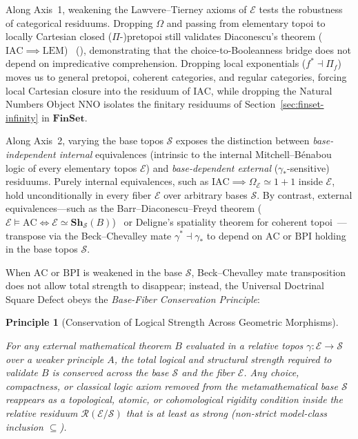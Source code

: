 \documentclass[10pt,twoside,openright]{book}
\theoremstyle{crmplain}
\newtheorem{principle}[theorem]{Principle}
\theoremstyle{crmdef}
\theoremstyle{crmremark}
\begin{document}
Along Axis~1, weakening the Lawvere--Tierney axioms of $\mathcal{E}$ tests the robustness of categorical residuums. Dropping $\Omega$ and passing from elementary topoi to locally Cartesian closed ($\Pi$-)pretopoi still validates Diaconescu's theorem ($\mathrm{IAC} \implies \mathrm{LEM}$)~\cite{Diaconescu75,Maietti05} (\cite[\S D4.5]{Johnstone02}), demonstrating that the choice-to-Booleanness bridge does not depend on impredicative comprehension. Dropping local exponentials ($f^* \dashv \Pi_f$) moves us to general pretopoi, coherent categories, and regular categories, forcing local Cartesian closure into the residuum of $\mathrm{IAC}$, while dropping the Natural Numbers Object $\mathrm{NNO}$ isolates the finitary residuums of Section~\ref{sec:finset-infinity} in $\mathbf{FinSet}$.

Along Axis~2, varying the base topos $\mathcal{S}$ exposes the distinction between \emph{base-independent internal} equivalences (intrinsic to the internal Mitchell--B\'enabou logic of every elementary topos $\mathcal{E}$) and \emph{base-dependent external} ($\gamma_*$-sensitive) residuums. Purely internal equivalences, such as $\mathrm{IAC} \implies \Omega_{\mathcal{E}} \simeq 1+1$ inside $\mathcal{E}$, hold unconditionally in every fiber $\mathcal{E}$ over arbitrary bases $\mathcal{S}$. By contrast, external equivalences---such as the Barr--Diaconescu--Freyd theorem ($\mathcal{E} \models \mathrm{AC} \iff \mathcal{E} \simeq \mathbf{Sh}_{\mathcal{S}}(B)$)~\cite{Barr74,Diaconescu75,Freyd72} or Deligne's spatiality theorem for coherent topoi~\cite{Deligne72}---transpose via the Beck--Chevalley mate $\gamma^* \dashv \gamma_*$ to depend on $\mathrm{AC}$ or $\mathrm{BPI}$ holding in the base topos $\mathcal{S}$.

When $\mathrm{AC}$ or $\mathrm{BPI}$ is weakened in the base $\mathcal{S}$, Beck--Chevalley mate transposition does not allow total strength to disappear; instead, the Universal Doctrinal Square Defect obeys the \emph{Base-Fiber Conservation Principle}:

\begin{principle}[Conservation of Logical Strength Across Geometric Morphisms]\label{prin:conservation}%
%

For any external mathematical theorem $B$ evaluated in a relative topos $\gamma: \mathcal{E} \to \mathcal{S}$ over a weaker principle $A$, the total logical and structural strength required to validate $B$ is conserved across the base $\mathcal{S}$ and the fiber $\mathcal{E}$. Any choice, compactness, or classical logic axiom removed from the metamathematical base $\mathcal{S}$ reappears as a topological, atomic, or cohomological rigidity condition inside the relative residuum $\mathcal{R}(\mathcal{E}/\mathcal{S})$ that is at least as strong (non-strict model-class inclusion $\subseteq$).

\end{principle}
\end{document}
